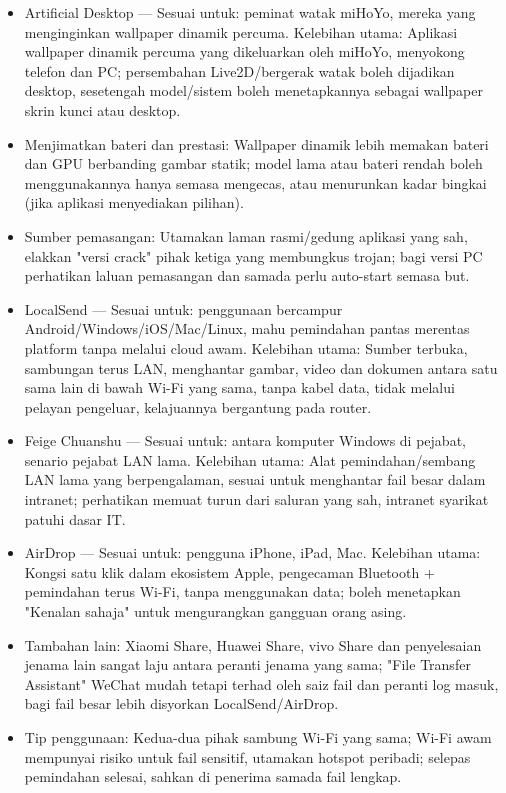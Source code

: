 \begin{itemize}
  \item Artificial Desktop — Sesuai untuk: peminat watak miHoYo, mereka yang menginginkan wallpaper dinamik percuma. Kelebihan utama: Aplikasi wallpaper dinamik percuma yang dikeluarkan oleh miHoYo, menyokong telefon dan PC; persembahan Live2D/bergerak watak boleh dijadikan desktop, sesetengah model/sistem boleh menetapkannya sebagai wallpaper skrin kunci atau desktop.
  \item Menjimatkan bateri dan prestasi: Wallpaper dinamik lebih memakan bateri dan GPU berbanding gambar statik; model lama atau bateri rendah boleh menggunakannya hanya semasa mengecas, atau menurunkan kadar bingkai (jika aplikasi menyediakan pilihan).
  \item Sumber pemasangan: Utamakan laman rasmi/gedung aplikasi yang sah, elakkan "versi crack" pihak ketiga yang membungkus trojan; bagi versi PC perhatikan laluan pemasangan dan samada perlu auto-start semasa but.
\end{itemize}


\begin{itemize}
  \item LocalSend — Sesuai untuk: penggunaan bercampur Android/Windows/iOS/Mac/Linux, mahu pemindahan pantas merentas platform tanpa melalui cloud awam. Kelebihan utama: Sumber terbuka, sambungan terus LAN, menghantar gambar, video dan dokumen antara satu sama lain di bawah Wi-Fi yang sama, tanpa kabel data, tidak melalui pelayan pengeluar, kelajuannya bergantung pada router.
  \item Feige Chuanshu — Sesuai untuk: antara komputer Windows di pejabat, senario pejabat LAN lama. Kelebihan utama: Alat pemindahan/sembang LAN lama yang berpengalaman, sesuai untuk menghantar fail besar dalam intranet; perhatikan memuat turun dari saluran yang sah, intranet syarikat patuhi dasar IT.
  \item AirDrop — Sesuai untuk: pengguna iPhone, iPad, Mac. Kelebihan utama: Kongsi satu klik dalam ekosistem Apple, pengecaman Bluetooth + pemindahan terus Wi-Fi, tanpa menggunakan data; boleh menetapkan "Kenalan sahaja" untuk mengurangkan gangguan orang asing.
  \item Tambahan lain: Xiaomi Share, Huawei Share, vivo Share dan penyelesaian jenama lain sangat laju antara peranti jenama yang sama; "File Transfer Assistant" WeChat mudah tetapi terhad oleh saiz fail dan peranti log masuk, bagi fail besar lebih disyorkan LocalSend/AirDrop.
  \item Tip penggunaan: Kedua-dua pihak sambung Wi-Fi yang sama; Wi-Fi awam mempunyai risiko untuk fail sensitif, utamakan hotspot peribadi; selepas pemindahan selesai, sahkan di penerima samada fail lengkap.
\end{itemize}

